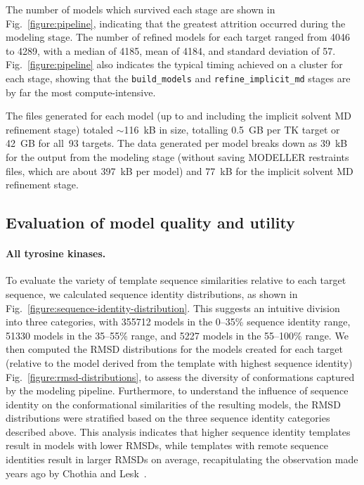 \documentclass[10pt,letterpaper]{article}
\begin{document}
The number of models which survived each stage are shown in Fig.~\ref{figure:pipeline}, indicating that the greatest attrition occurred during the modeling stage.
The number of refined models for each target ranged from \num{4046} to \num{4289}, with a median of \num{4185}, mean of \num{4184}, and standard deviation of \num{57}.
Fig.~\ref{figure:pipeline} also indicates the typical timing achieved on a cluster for each stage, showing that the {\tt build\_models} and {\tt refine\_implicit\_md} stages are by far the most compute-intensive.

The files generated for each model (up to and including the implicit solvent MD refinement stage) totaled $\sim$116~kB in size, totalling 0.5~GB per TK target or 42~GB for all~93 targets.
The data generated per model breaks down as 39~kB for the output from the modeling stage (without saving MODELLER restraints files, which are about 397~kB per model) and 77~kB for the implicit solvent MD refinement stage.

\subsection*{Evaluation of model quality and utility}

\paragraph{All tyrosine kinases.}

To evaluate the variety of template sequence similarities relative to each target sequence, we calculated sequence identity distributions, as shown in Fig.~\ref{figure:sequence-identity-distribution}.
This suggests an intuitive division into three categories, with \num{355712} models in the 0--35\% sequence identity range, \num{51330} models in the 35--55\% range, and \num{5227} models in the 55--100\% range.
We then computed the RMSD distributions for the models created for each target (relative to the model derived from the template with highest sequence identity) Fig.~\ref{figure:rmsd-distributions}, to assess the diversity of conformations captured by the modeling pipeline.
Furthermore, to understand the influence of sequence identity on the conformational similarities of the resulting models, the RMSD distributions were stratified based on the three sequence identity categories described above.
This analysis indicates that higher sequence identity templates result in models with lower RMSDs, while templates with remote sequence identities result in larger RMSDs on average, recapitulating the observation made years ago by Chothia and Lesk~\cite{chothia-lesk:embo-j:1986:rmsd-sequence-identity-relation}.
\end{document}
